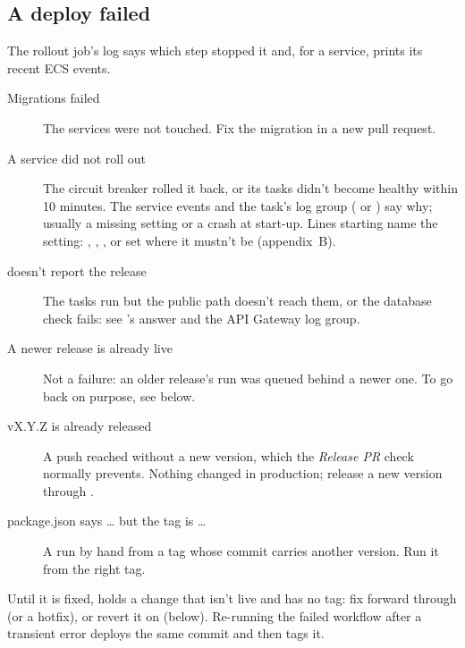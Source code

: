 \subsection{A deploy failed}
The rollout job's log says which step stopped it and, for a service, prints its recent ECS events.
\begin{description}
  \item[Migrations failed] The services were not touched. Fix the migration in a new pull request.
  \item[A service did not roll out] The circuit breaker rolled it back, or its tasks didn't become
    healthy within 10 minutes. The service events and the task's log group ( or
    ) say why; usually a missing setting or a crash at start-up. Lines
    starting \code{[startup]} name the setting: , ,
    , or  set where it mustn't be (appendix~B).
  \item[ doesn't report the release] The tasks run but the public path doesn't
    reach them, or the database check fails: see 's answer and the API Gateway
    log group.
  \item[A newer release is already live] Not a failure: an older release's run was queued behind
    a newer one. To go back on purpose, see below.
  \item[vX.Y.Z is already released] A push reached  without a new version, which the
    \emph{Release PR} check normally prevents. Nothing changed in production; release a new
    version through .
  \item[package.json says … but the tag is …] A run by hand from a tag whose commit carries
    another version. Run it from the right tag.
\end{description}
Until it is fixed,  holds a change that isn't live and has no tag: fix forward
through  (or a hotfix), or revert it on  (below). Re-running the failed
workflow after a transient error deploys the same commit and then tags it.

